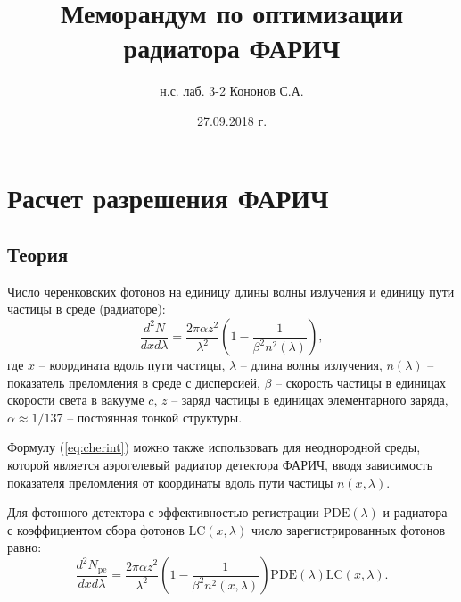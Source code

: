 \documentclass[12pt]{article}
\title{\Large\bf Меморандум по оптимизации радиатора ФАРИЧ}
\author{\large н.с. лаб. 3-2 Кононов С.А.}
\date{\large 27.09.2018 г.}
\begin{document}
\maketitle

\section{Расчет разрешения ФАРИЧ}
\subsection{Теория}
Число черенковских фотонов на единицу длины волны излучения и единицу пути частицы в среде (радиаторе):
\begin{equation}
\frac{d^2N}{dx d\lambda} = \frac{2\pi\alpha z^2}{\lambda^2}\left(1 - \frac{1}{\beta^2 n^2(\lambda)}\right),
\label{eq:cherint}
\end{equation}
где $x$ -- координата вдоль пути частицы, $\lambda$ -- длина волны излучения,
$n(\lambda)$ -- показатель преломления в среде с дисперсией,
$\beta$ -- скорость частицы в единицах скорости света в вакууме $c$, $z$ -- заряд частицы в единицах элементарного заряда, 
$\alpha\approx 1/137$ -- постоянная тонкой структуры.

Формулу (\ref{eq:cherint}) можно также использовать для неоднородной среды, которой является аэрогелевый радиатор детектора ФАРИЧ, вводя
зависимость показателя преломления от координаты вдоль пути частицы $n(x,\lambda)$.

Для фотонного детектора с эффективностью регистрации $\mathrm{PDE}(\lambda)$ и радиатора с коэффициентом сбора 
фотонов $\mathrm{LC}(x,\lambda)$ число зарегистрированных фотонов равно:
\begin{equation}
\frac{d^2N_\mathrm{pe}}{dx d\lambda} = \frac{2\pi\alpha z^2}{\lambda^2}\left(1 - \frac{1}{\beta^2 n^2(x,\lambda)}\right)
\mathrm{PDE}(\lambda)\mathrm{LC}(x,\lambda).
\label{eq:cherintdet}
\end{equation}
\end{document}
